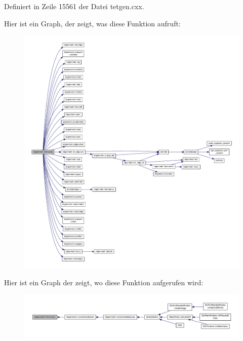 Definiert in Zeile 15561 der Datei tetgen.\-cxx.



Hier ist ein Graph, der zeigt, was diese Funktion aufruft\-:\nopagebreak
\begin{figure}[H]
\begin{center}
\leavevmode
\includegraphics[width=350pt]{classtetgenmesh_a3b116575f33fc21499796663ed1f9461_cgraph}
\end{center}
\end{figure}




Hier ist ein Graph der zeigt, wo diese Funktion aufgerufen wird\-:\nopagebreak
\begin{figure}[H]
\begin{center}
\leavevmode
\includegraphics[width=350pt]{classtetgenmesh_a3b116575f33fc21499796663ed1f9461_icgraph}
\end{center}
\end{figure}


